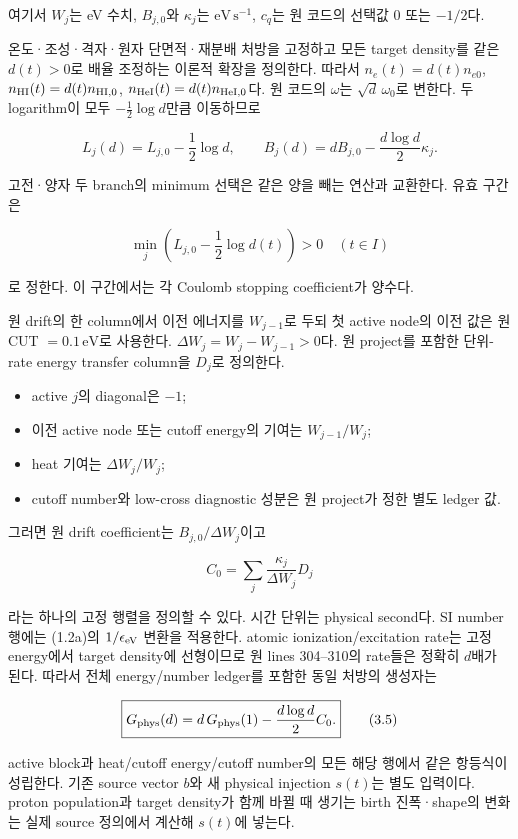 \documentclass[11pt,a4paper]{article}
\providecommand{\tightlist}{\setlength{\itemsep}{2pt}\setlength{\parskip}{0pt}}
\begin{document}
여기서 \(W_j\)는 eV 수치, \(B_{j,0}\)와 \(\kappa_j\)는 \(\mathrm{eV\,s^{-1}}\), \(c_q\)는 원 코드의 선택값 0 또는 \(-1/2\)다.

온도·조성·격자·원자 단면적·재분배 처방을 고정하고 모든 target density를 같은 \(d(t)>0\)로 배율 조정하는 이론적 확장을 정의한다. 따라서 \(n_e(t)=d(t)n_{e0}\), \(n_{\rm HI}(t)=d(t)n_{\rm HI,0}\), \(n_{\rm HeI}(t)=d(t)n_{\rm HeI,0}\)다. 원 코드의 \(\omega\)는 \(\sqrt d\,\omega_0\)로 변한다. 두 logarithm이 모두 \(-\tfrac12\log d\)만큼 이동하므로

\[
\boxed{
L_j(d)=L_{j,0}-\frac12\log d,\qquad
B_j(d)=d B_{j,0}-\frac{d\log d}{2}\kappa_j.
}
\tag{3.2}
\]

고전·양자 두 branch의 minimum 선택은 같은 양을 빼는 연산과 교환한다. 유효 구간은

\[
\boxed{
\min_j\left(L_{j,0}-\frac12\log d(t)\right)>0
\quad(t\in I)
}
\tag{3.3}
\]

로 정한다. 이 구간에서는 각 Coulomb stopping coefficient가 양수다.

원 drift의 한 column에서 이전 에너지를 \(W_{j-1}\)로 두되 첫 active node의 이전 값은 원 CUT \(=0.1\,\mathrm{eV}\)로 사용한다. \(\Delta W_j=W_j-W_{j-1}>0\)다. 원 project를 포함한 단위-rate energy transfer column을 \(D_j\)로 정의한다.

\begin{itemize}
\tightlist
\item
  active \(j\)의 diagonal은 \(-1\);
\item
  이전 active node 또는 cutoff energy의 기여는 \(W_{j-1}/W_j\);
\item
  heat 기여는 \(\Delta W_j/W_j\);
\item
  cutoff number와 low-cross diagnostic 성분은 원 project가 정한 별도 ledger 값.
\end{itemize}

그러면 원 drift coefficient는 \(B_{j,0}/\Delta W_j\)이고

\[
C_0=\sum_j\frac{\kappa_j}{\Delta W_j}D_j
\tag{3.4}
\]

라는 하나의 고정 행렬을 정의할 수 있다. 시간 단위는 physical second다. SI number 행에는 (1.2a)의 \(1/\epsilon_{\rm eV}\) 변환을 적용한다. atomic ionization/excitation rate는 고정 energy에서 target density에 선형이므로 원 lines 304--310의 rate들은 정확히 \(d\)배가 된다. 따라서 전체 energy/number ledger를 포함한 동일 처방의 생성자는

\[
\boxed{
G_{\rm phys}(d)
=d\,G_{\rm phys}(1)-\frac{d\log d}{2}C_0.
}
\tag{3.5}
\]

active block과 heat/cutoff energy/cutoff number의 모든 해당 행에서 같은 항등식이 성립한다. 기존 source vector \(b\)와 새 physical injection \(s(t)\)는 별도 입력이다. proton population과 target density가 함께 바뀔 때 생기는 birth 진폭·shape의 변화는 실제 source 정의에서 계산해 \(s(t)\)에 넣는다.
\end{document}
